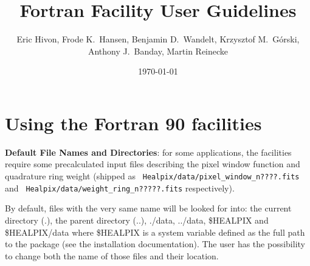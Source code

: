 \documentclass[12pt,twoside]{article}
\begin{document}
\title{\healpix Fortran Facility User Guidelines}
\author{Eric Hivon, Frode K.~Hansen, Benjamin D.~Wandelt, Krzysztof M.~G\'orski,
Anthony J.~Banday, Martin Reinecke}
\date{\today}

\frontpage
\tableofcontents
\newpage

\section{Using the \healpix Fortran 90 facilities}
\label{section:defdir}
{\bf {Default File Names and Directories}}: for some applications, the \healpix facilities
require some precalculated input files describing the pixel window
function and quadrature ring weight (shipped as {\tt
Healpix/data/pixel\_window\_n????.fits} and {\tt
Healpix/data/weight\_ring\_n?????.fits} respectively). \label{page:defdir}

By default, files with the very same name will be looked for into: the current directory (.), the parent directory (..),
./data, ../data, \$HEALPIX and \$HEALPIX/data where \$HEALPIX is
a system variable defined as the full path to the \healpix package
(see the installation documentation).
The user has the possibility to change both the name of those files
and their location.
\end{document}
